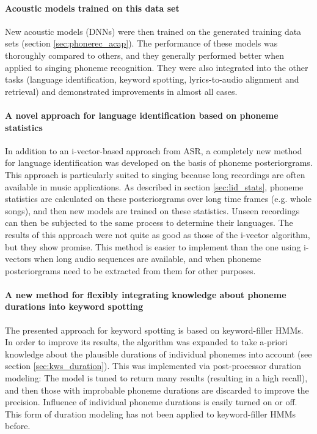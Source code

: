 \paragraph{Acoustic models trained on this data set}
New acoustic models (DNNs) were then trained on the generated training data sets (section \ref{sec:phonerec_acap}). The performance of these models was thoroughly compared to others, and they generally performed better when applied to singing phoneme recognition. They were also integrated into the other tasks (language identification, keyword spotting, lyrics-to-audio alignment and retrieval) and demonstrated improvements in almost all cases.

\paragraph{A novel approach for language identification based on phoneme statistics}
In addition to an i-vector-based approach from ASR, a completely new method for language identification was developed on the basis of phoneme posteriorgrams. This approach is particularly suited to singing because long recordings are often available in music applications. As described in section \ref{sec:lid_stats}, phoneme statistics are calculated on these posteriorgrams over long time frames (e.g. whole songs), and then new models are trained on these statistics. Unseen recordings can then be subjected to the same process to determine their languages. The results of this approach were not quite as good as those of the i-vector algorithm, but they show promise. This method is easier to implement than the one using i-vectors when long audio sequences are available, and when phoneme posteriorgrams need to be extracted from them for other purposes.

\paragraph{A new method for flexibly integrating knowledge about phoneme durations into keyword spotting}
The presented approach for keyword spotting is based on keyword-filler HMMs. In order to improve its results, the algorithm was expanded to take a-priori knowledge about the plausible durations of individual phonemes into account (see section \ref{sec:kws_duration}). This was implemented via post-processor duration modeling: The model is tuned to return many results (resulting in a high recall), and then those with improbable phoneme durations are discarded to improve the precision. Influence of individual phoneme durations is easily turned on or off.  This form of duration modeling has not been applied to keyword-filler HMMs before. 

